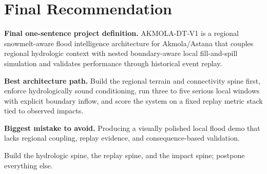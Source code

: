 \documentclass[11pt,a4paper]{article}
\begin{document}
\section{Final Recommendation}

\textbf{Final one-sentence project definition.} AKMOLA-DT-V1 is a regional snowmelt-aware flood intelligence architecture for Akmola/Astana that couples regional hydrologic context with nested boundary-aware local fill-and-spill simulation and validates performance through historical event replay.

\textbf{Best architecture path.} Build the regional terrain and connectivity spine first, enforce hydrologically sound conditioning, run three to five serious local windows with explicit boundary inflow, and score the system on a fixed replay metric stack tied to observed impacts.

\textbf{Biggest mistake to avoid.} Producing a visually polished local flood demo that lacks regional coupling, replay evidence, and consequence-based validation.

\vspace{1.2em}
\begin{center}
\small\color{accent}
Build the hydrologic spine, the replay spine, and the impact spine; postpone everything else.
\end{center}
\end{document}
